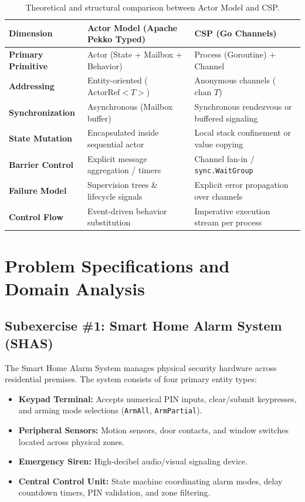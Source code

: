 \documentclass[11pt,a4paper]{article}
\begin{document}
\begin{table}[h]
\centering
\small
\caption{Theoretical and structural comparison between Actor Model and CSP.}
\label{tab:paradigm-comparison}
\begin{tabularx}{\textwidth}{l>{\raggedright\arraybackslash}X>{\raggedright\arraybackslash}X}
\toprule
\textbf{Dimension} & \textbf{Actor Model (Apache Pekko Typed)} & \textbf{CSP (Go Channels)} \\
\midrule
\textbf{Primary Primitive} & Actor (State + Mailbox + Behavior) & Process (Goroutine) + Channel \\
\textbf{Addressing} & Entity-oriented ($\text{ActorRef}<T>$) & Anonymous channels ($\text{chan } T$) \\
\textbf{Synchronization} & Asynchronous (Mailbox buffer) & Synchronous rendezvous or buffered signaling \\
\textbf{State Mutation} & Encapsulated inside sequential actor & Local stack confinement or value copying \\
\textbf{Barrier Control} & Explicit message aggregation / timers & Channel fan-in / \texttt{sync.WaitGroup} \\
\textbf{Failure Model} & Supervision trees \& lifecycle signals & Explicit error propagation over channels \\
\textbf{Control Flow} & Event-driven behavior substitution & Imperative execution stream per process \\
\bottomrule
\end{tabularx}
\end{table}

\section{Problem Specifications and Domain Analysis}

\subsection{Subexercise \#1: Smart Home Alarm System (SHAS)}

The Smart Home Alarm System manages physical security hardware across residential premises. The system consists of four primary entity types:
\begin{itemize}[leftmargin=*]
    \item \textbf{Keypad Terminal:} Accepts numerical PIN inputs, clear/submit keypresses, and arming mode selections (\texttt{ArmAll}, \texttt{ArmPartial}).
    \item \textbf{Peripheral Sensors:} Motion sensors, door contacts, and window switches located across physical zones.
    \item \textbf{Emergency Siren:} High-decibel audio/visual signaling device.
    \item \textbf{Central Control Unit:} State machine coordinating alarm modes, delay countdown timers, PIN validation, and zone filtering.
\end{itemize}
\end{document}
